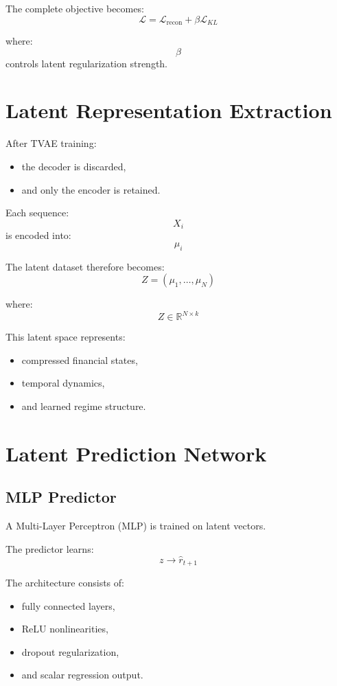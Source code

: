 \documentclass[11pt]{article}
\begin{document}
The complete objective becomes:
\[
\mathcal{L}
=
\mathcal{L}_{\text{recon}}
+
\beta
\mathcal{L}_{KL}
\]

where:
\[
\beta
\]
controls latent regularization strength.

\section{Latent Representation Extraction}

After TVAE training:
\begin{itemize}
    \item the decoder is discarded,
    \item and only the encoder is retained.
\end{itemize}

Each sequence:
\[
X_i
\]
is encoded into:
\[
\mu_i
\]

The latent dataset therefore becomes:
\[
Z
=
(\mu_1,\dots,\mu_N)
\]

where:
\[
Z
\in
\mathbb{R}^{N\times k}
\]

This latent space represents:
\begin{itemize}
    \item compressed financial states,
    \item temporal dynamics,
    \item and learned regime structure.
\end{itemize}

\section{Latent Prediction Network}

\subsection{MLP Predictor}

A Multi-Layer Perceptron (MLP) is trained on latent vectors.

The predictor learns:
\[
z
\rightarrow
\hat r_{t+1}
\]

The architecture consists of:
\begin{itemize}
    \item fully connected layers,
    \item ReLU nonlinearities,
    \item dropout regularization,
    \item and scalar regression output.
\end{itemize}
\end{document}
